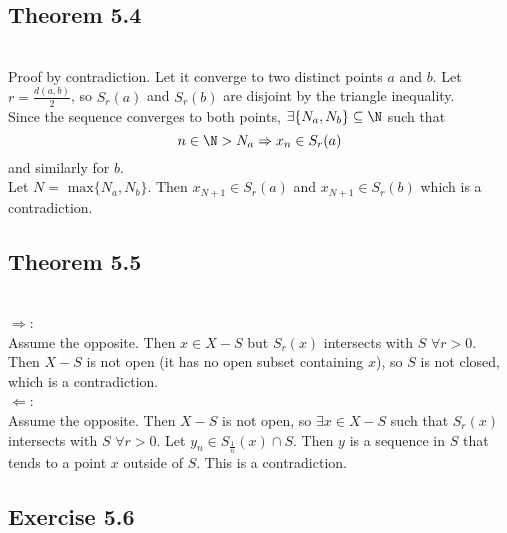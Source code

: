 \subsection{Theorem 5.4}
\setcounter{question}{0}


\begin{solution}
 \\Proof by contradiction. Let it converge to two distinct points $a$ and $b$. Let $r = \frac{d(a,b)}{2}$, so $S_r(a)$ and $S_r(b)$ are disjoint by the triangle inequality.\\
 Since the sequence converges to both points, $\exists \{N_a,N_b\} \subseteq \N$ such that
 $$n \in \N > N_a \Rightarrow x_n \in S_r(a)$$
 and similarly for $b$. \\
 Let $N = \text{ max} \{N_a,N_b\}$. Then $x_{N+1} \in S_r(a)$ and $x_{N+1} \in S_r(b)$ which is a contradiction.
\end{solution}

\subsection{Theorem 5.5} \label{thm3.5.5}
\setcounter{question}{0}


\begin{solution}
 \\$\Rightarrow$: \\
 Assume the opposite. Then $x \in X-S$ but $S_r(x)$ intersects with $S$ $\forall r > 0$. Then $X-S$ is not open (it has no open subset containing $x$), so $S$ is not closed, which is a contradiction. \\
 $\Leftarrow$: \\
 Assume the opposite. Then $X-S$ is not open, so $\exists x \in X-S$ such that $S_r(x)$ intersects with $S$ $\forall r > 0$. Let $y_n \in S_{\frac{1}{n}}(x) \cap S$. Then $y$ is a sequence in $S$ that tends to a point $x$ outside of $S$. This is a contradiction.
\end{solution}

\subsection{Exercise 5.6}
\setcounter{question}{0}

